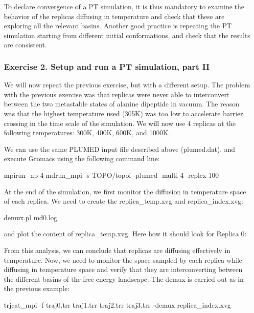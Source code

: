 To declare convergence of a P\+T simulation, it is thus mandatory to examine the behavior of the replicas diffusing in temperature and check that these are exploring all the relevant basins. Another good practice is repeating the P\+T simulation starting from different initial conformations, and check that the results are consistent.\hypertarget{belfast-7_belfast-7-exercise-2}{}\subsubsection{Exercise 2. Setup and run a P\+T simulation, part I\+I}\label{belfast-7_belfast-7-exercise-2}
We will now repeat the previous exercise, but with a different setup. The problem with the previous exercise was that replicas were never able to interconvert between the two metastable states of alanine dipeptide in vacuum. The reason was that the highest temperature used (305\+K) was too low to accelerate barrier crossing in the time scale of the simulation. We will now use 4 replicas at the following temperatures\+: 300\+K, 400\+K, 600\+K, and 1000\+K.

We can use the same P\+L\+U\+M\+E\+D input file described above (plumed.\+dat), and execute Gromacs using the following command line\+:

\begin{DoxyVerb} mpirun -np 4 mdrun_mpi -s TOPO/topol -plumed -multi 4 -replex 100
\end{DoxyVerb}


At the end of the simulation, we first monitor the diffusion in temperature space of each replica. We need to create the replica\+\_\+temp.\+xvg and replica\+\_\+index.\+xvg\+:

\begin{DoxyVerb}demux.pl md0.log
\end{DoxyVerb}


and plot the content of replica\+\_\+temp.\+xvg. Here how it should look for Replica 0\+:

\label{belfast-7_belfast-7-pt2temp-fig}%
\hypertarget{belfast-7_belfast-7-pt2temp-fig}{}%
 From this analysis, we can conclude that replicas are diffusing effectively in temperature. Now, we need to monitor the space sampled by each replica while diffusing in temperature space and verify that they are interconverting between the different basins of the free-\/energy landscape. The demux is carried out as in the previous example\+:

\begin{DoxyVerb}trjcat_mpi -f traj0.trr traj1.trr traj2.trr traj3.trr -demux replica_index.xvg
\end{DoxyVerb}


